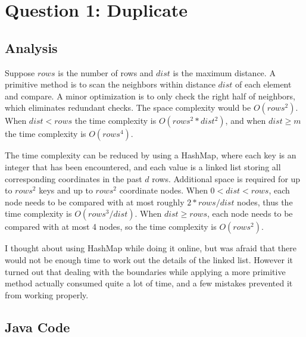 \section{Question 1: Duplicate}

\subsection{Analysis}

Suppose $rows$ is the number of rows and $dist$ is the maximum distance. A
primitive method is to scan the neighbors within distance $dist$ of each
element and compare. A minor optimization is to only check the right half of
neighbors, which eliminates redundant checks. The space complexity would be
$O(rows^2)$. When $dist < rows$ the time complexity is $O(rows^2 * dist^2)$,
and when $dist \geq m$ the time complexity is $O(rows^4)$.

The time complexity can be reduced by using a HashMap, where each key is an
integer that has been encountered, and each value is a linked list storing all
corresponding coordinates in the past $d$ rows. Additional space is required
for up to $rows^2$ keys and up to $rows^2$ coordinate nodes. When $0 < dist <
rows$, each node needs to be compared with at most roughly $2 * rows / dist$
nodes, thus the time complexity is $O(rows^3 / dist)$. When $dist \geq rows$,
each node needs to be compared with at most 4 nodes, so the time complexity is
$O(rows^2)$.

I thought about using HashMap while doing it online, but was afraid that there
would not be enough time to work out the details of the linked list. However it
turned out that dealing with the boundaries while applying a more primitive
method actually consumed quite a lot of time, and a few mistakes prevented it
from working properly.

\subsection{Java Code}

